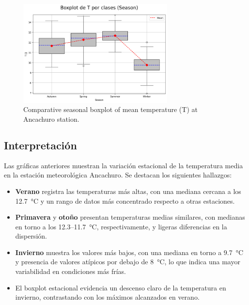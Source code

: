 \vspace{0.2cm}

\begin{figure}[htbp]
\centering
\includegraphics[width=0.7\textwidth]{resultados/por_estacion_del_anio/boxplot_clases_por_estacion/Ancachuro/T_ClassBoxplot_Season.png}
\caption{Comparative seasonal boxplot of mean temperature (T) at Ancachuro station.}
\label{fig:ancachuro_t_box}
\end{figure}

\subsection*{Interpretación}

Las gráficas anteriores muestran la variación estacional de la temperatura media en la estación meteorológica Ancachuro. Se destacan los siguientes hallazgos:

\begin{itemize}
    \item \textbf{Verano} registra las temperaturas más altas, con una mediana cercana a los 12.7~°C y un rango de datos más concentrado respecto a otras estaciones.
    \item \textbf{Primavera} y \textbf{otoño} presentan temperaturas medias similares, con medianas en torno a los 12.3–11.7~°C, respectivamente, y ligeras diferencias en la dispersión.
    \item \textbf{Invierno} muestra los valores más bajos, con una mediana en torno a 9.7~°C y presencia de valores atípicos por debajo de 8~°C, lo que indica una mayor variabilidad en condiciones más frías.
    \item El boxplot estacional evidencia un descenso claro de la temperatura en invierno, contrastando con los máximos alcanzados en verano.
\end{itemize}



